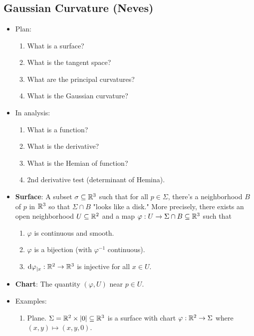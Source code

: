 \documentclass[../apprentice.tex]{subfiles}
\begin{document}
\chapter{}
\section{Gaussian Curvature (Neves)}
\begin{itemize}
    \item {}Plan:
    \begin{enumerate}
        \item What is a surface?
        \item What is the tangent space?
        \item What are the principal curvatures?
        \item What is the Gaussian curvature?
    \end{enumerate}
    \item In analysis:
    \begin{enumerate}
        \item What is a function?
        \item What is the derivative?
        \item What is the Hemian of function?
        \item 2nd derivative test (determinant of Hemina).
    \end{enumerate}
    \item \textbf{Surface}: A subset $\sigma\subseteq\mathbb{R}^3$ such that for all $p\in\Sigma$, there's a neighborhood $B$ of $p$ in $\mathbb{R}^3$ so that $\Sigma\cap B$ "looks like a disk." More precisely, there exists an open neighborhood $U\subseteq\mathbb{R}^2$ and a map $\varphi:U\to\Sigma\cap B\subseteq\mathbb{R}^3$ such that
    \begin{enumerate}[label={\roman*)}]
        \item $\varphi$ is continuous and smooth.
        \item $\varphi$ is a bijection (with $\varphi^{-1}$ continuous).
        \item $\dd{\varphi}_{|x}:\mathbb{R}^2\to\mathbb{R}^3$ is injective for all $x\in U$.
    \end{enumerate}
    \item \textbf{Chart}: The quantity $(\varphi,U)$ near $p\in U$.
    \item Examples:
    \begin{enumerate}[label={\Alph*)}]
        \item Plane. $\Sigma=\mathbb{R}^2\times|0|\subseteq\mathbb{R}^3$ is a surface with chart $\varphi:\mathbb{R}^2\to\Sigma$ where $(x,y)\mapsto(x,y,0)$.

\end{enumerate}
\end{itemize}
\end{document}
